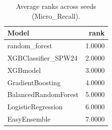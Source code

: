 \begin{table}[t]
\centering
\begin{tabular}{lr}
\toprule
Model & rank \\
\midrule
random_forest & 1.0000 \\
XGBClassifier_SPW24 & 2.0000 \\
XGBmodel & 3.0000 \\
GradientBoosting & 4.0000 \\
BalancedRandomForest & 5.0000 \\
LogisticRegression & 6.0000 \\
EasyEnsemble & 7.0000 \\
\bottomrule
\end{tabular}
\caption{Average ranks across seeds (Micro_Recall).}
\label{tab:avg_rank_Micro_Recall}
\end{table}